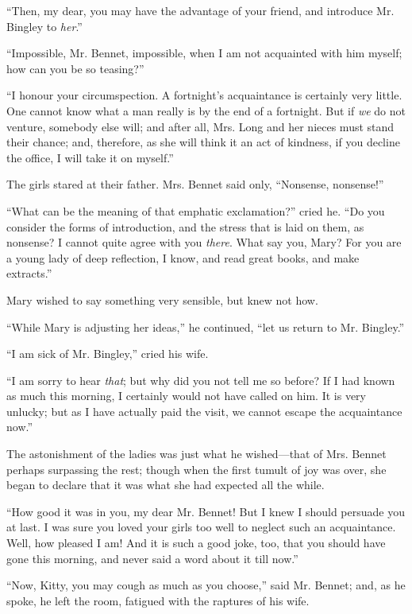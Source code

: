 \documentclass[12pt]{book}
\begin{document}
``Then, my dear, you may have the advantage of your friend, and introduce Mr. Bingley to \textit{her}.''

``Impossible, Mr. Bennet, impossible, when I am not acquainted with him myself; how can you be so teasing?''

``I honour your circumspection. A fortnight's acquaintance is certainly very little. One cannot know what a man really is by the end of a fortnight. But if \textit{we} do not venture, somebody else will; and after all, Mrs. Long and her nieces must stand their chance; and, therefore, as she will think it an act of kindness, if you decline the office, I will take it on myself.''

The girls stared at their father. Mrs. Bennet said only, ``Nonsense, nonsense!''

``What can be the meaning of that emphatic exclamation?'' cried he. ``Do you consider the forms of introduction, and the stress that is laid on them, as nonsense? I cannot quite agree with you \textit{there}. What say you, Mary? For you are a young lady of deep reflection, I know, and read great books, and make extracts.''

Mary wished to say something very sensible, but knew not how.

``While Mary is adjusting her ideas,'' he continued, ``let us return to Mr. Bingley.''

``I am sick of Mr. Bingley,'' cried his wife.

``I am sorry to hear \textit{that}; but why did you not tell me so before? If I had known as much this morning, I certainly would not have called on him. It is very unlucky; but as I have actually paid the visit, we cannot escape the acquaintance now.''

The astonishment of the ladies was just what he wished---that of Mrs. Bennet perhaps surpassing the rest; though when the first tumult of joy was over, she began to declare that it was what she had expected all the while.

``How good it was in you, my dear Mr. Bennet! But I knew I should persuade you at last. I was sure you loved your girls too well to neglect such an acquaintance. Well, how pleased I am! And it is such a good joke, too, that you should have gone this morning, and never said a word about it till now.''

``Now, Kitty, you may cough as much as you choose,'' said Mr. Bennet; and, as he spoke, he left the room, fatigued with the raptures of his wife.
\end{document}
